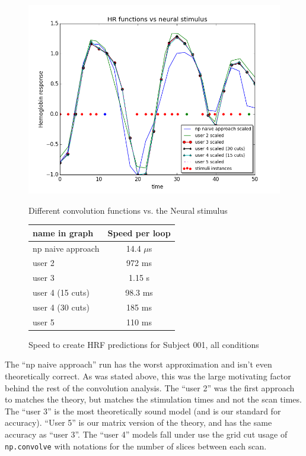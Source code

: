 \begin{figure}[ht]
\centering
	\begin{minipage}[b]{0.45\linewidth}
		\centering
		\includegraphics[width=.8\linewidth]{../images/convolution_vs_neural_stimulus}  
		\caption{\scriptsize{Different convolution functions vs. the Neural stimulus}}
		\label{fig:convolution}

	\end{minipage}
\quad
	\begin{minipage}[b]{0.45\linewidth}
		\centering
		\begin{tabular}{|l | c|}
		\hline
		name in graph       & Speed per loop \\
		\hline
		np naive approach & 14.4 $\mu$s  \\
		user 2     		    & 972 ms  \\
		user 3     		    & 1.15 s    \\
		user 4 (15 cuts)      & 98.3 ms \\
		user 4 (30 cuts)      & 185 ms  \\
		user 5     	 	    & 110 ms   \\
		\hline
		\end{tabular}
		\vspace{5mm}
		\caption{\scriptsize{Speed to create HRF predictions for Subject 001, 
		all conditions}}
		\label{table:convolution}
	\end{minipage}
\end{figure}

The ``np naive approach'' run has the worst approximation and isn't even 
theoretically correct. As was stated above, this was the large motivating factor 
behind the rest of the convolution analysis. The ``user 2'' was the first approach to
matches the theory, but matches the stimulation times and not the scan times.
The ``user 3'' is the most theoretically sound model (and is our standard for 
accuracy). ``User 5''  is our matrix version of the theory, and has the same 
accuracy as ``user 3''. The ``user 4'' models fall under use the grid cut usage of 
\texttt{np.convolve} with notations for the number of slices between each 
scan.



